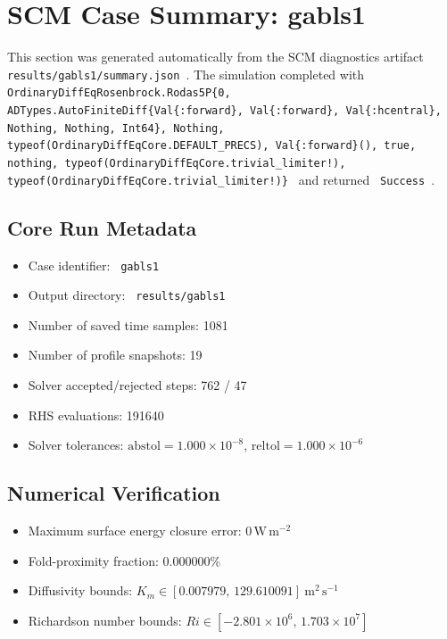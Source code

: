 \section{SCM Case Summary: gabls1}
\label{sec:scm_case_gabls1}

This section was generated automatically from the SCM diagnostics artifact
\texttt{ results/gabls1/summary.json }. The simulation completed with \texttt{ OrdinaryDiffEqRosenbrock.Rodas5P\{0, ADTypes.AutoFiniteDiff\{Val\{:forward\}, Val\{:forward\}, Val\{:hcentral\}, Nothing, Nothing, Int64\}, Nothing, typeof(OrdinaryDiffEqCore.DEFAULT\_PRECS), Val\{:forward\}(), true, nothing, typeof(OrdinaryDiffEqCore.trivial\_limiter!), typeof(OrdinaryDiffEqCore.trivial\_limiter!)\} }
and returned \texttt{ Success }.

\subsection{Core Run Metadata}
\begin{itemize}
  \item Case identifier: \texttt{ gabls1 }
  \item Output directory: \texttt{ results/gabls1 }
  \item Number of saved time samples: 1081
  \item Number of profile snapshots: 19
  \item Solver accepted/rejected steps: 762 / 47
  \item RHS evaluations: 191640
  \item Solver tolerances: $\mathrm{abstol}=1.000 \times 10^{-8}$, $\mathrm{reltol}=1.000 \times 10^{-6}$
\end{itemize}

\subsection{Numerical Verification}
\begin{itemize}
  \item Maximum surface energy closure error:
  $0\,\mathrm{W\,m^{-2}}$
  \item Fold-proximity fraction:
  $0.000000\%$
  \item Diffusivity bounds:
  $K_m \in [0.007979,\,129.610091]~\mathrm{m^2\,s^{-1}}$
  \item Richardson number bounds:
  $Ri \in [-2.801 \times 10^{6},\,1.703 \times 10^{7}]$
\end{itemize}


